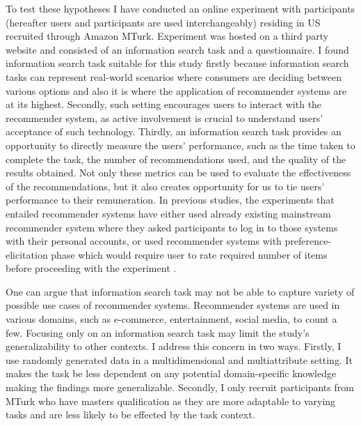 \documentclass[a4paper,12pt]{article}
\begin{document}
To test these hypotheses I have conducted an online experiment with participants (hereafter users and participants are used interchangeably) residing in US recruited through Amazon MTurk. Experiment was hosted on a third party website and consisted of an information search task and a questionnaire. I found information search task suitable for this study firstly because information search tasks can represent real-world scenarios where consumers are deciding between various options and also it is where the application of recommender systems are at its highest. Secondly, such setting encourages users to interact with the recommender system, as active involvement is crucial to understand users' acceptance of such technology. Thirdly, an information search task provides an opportunity to directly measure the users' performance, such as the time taken to complete the task, the number of recommendations used, and the quality of the results obtained. Not only these metrics can be used to evaluate the effectiveness of the recommendations, but it also creates opportunity for us to tie users' performance to their remuneration. In previous studies, the experiments that entailed recommender systems have either used already existing mainstream recommender system where they asked participants to log in to those systems with their personal accounts, or used recommender systems with preference-elicitation phase which would require user to rate required number of items before proceeding with the experiment \citep{millecampControllingSpotifyRecommendations2018}. 

One can argue that information search task may not be able to capture variety of possible use cases of recommender systems. Recommender systems are used in various domains, such as e-commerce, entertainment, social media, to count a few. Focusing only on an information search task may limit the study's generalizability to other contexts. I address this concern in two ways. Firstly, I use randomly generated data in a multidimensional and multiattribute setting. It makes the task be less dependent on any potential domain-specific knowledge making the findings more generalizable. Secondly, I only recruit participants from MTurk who have masters qualification as they are more adaptable to varying tasks and are less likely to be effected by the task context. 
\end{document}
